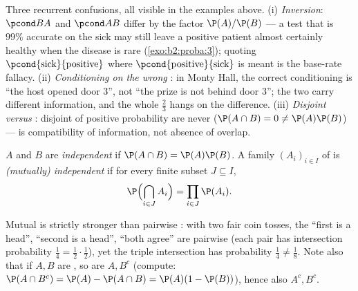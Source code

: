\begin{remark}
Three recurrent confusions, all visible in the examples
above. (i) \emph{Inversion}: $\pcond BA$ and $\pcond AB$
differ by the factor $\P(A)/\P(B)$ --- a test that is
$99\%$ accurate on the sick may still leave a positive
patient almost certainly healthy when the disease is rare
(\cref{exo:b2:proba:3}); quoting $\pcond{\text{sick}}{
\text{positive}}$ where $\pcond{\text{positive}}{
\text{sick}}$ is meant is the base-rate fallacy. (ii)
\emph{Conditioning on the wrong }: in Monty Hall, the
correct conditioning  is ``the host opened door $3$'',
not ``the prize is not behind door $3$''; the two carry
different information, and the whole $\frac23$ hangs on the
difference. (iii) \emph{Disjoint versus }:
disjoint  of positive probability are never
 ($\P(A\cap B) = 0 \neq \P(A)\P(B)$) ---
 is compatibility of information, not absence of
overlap.
\end{remark}

\begin{definition}[Independence]\label{def:b2:proba:independence}
 $A$ and $B$ are \emph{independent} if $\P(A \cap B) =
\P(A)\P(B)$. A family $(A_i)_{i \in I}$ of  is
\emph{(mutually) independent} if for every finite subset $J
\subseteq I$,
\[
\P\Bigl(\bigcap_{i \in J} A_i\Bigr)
= \prod_{i \in J} \P(A_i) .
\]
\end{definition}

\begin{remark}
Mutual  is strictly stronger than pairwise
: with two fair coin tosses, the  ``first is a
head'', ``second is a head'', ``both agree'' are pairwise
 (each pair has intersection probability $\frac14 =
\frac12\cdot\frac12$), yet the triple intersection has probability
$\frac14 \neq \frac18$. Note also that if $A, B$ are ,
so are $A, B^c$ (compute: $\P(A \cap B^c) = \P(A) - \P(A\cap B) =
\P(A)(1 - \P(B))$), hence also $A^c, B^c$.
\end{remark}

